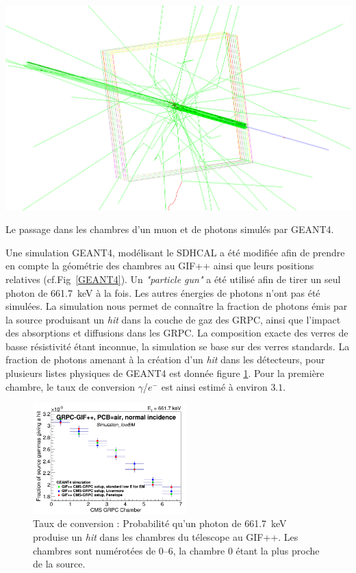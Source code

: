 \marginpar
{
	\centering
	\includegraphics[width=\marginparwidth]{GLA/geant4.png}
	\captionsetup{type=figure}\caption{Le passage dans les chambres d'un muon et de photons simulés par GEANT4.}
	\label{GEANT4}
}

Une simulation GEANT4, modélisant le SDHCAL a été modifiée afin de prendre en compte la géométrie des chambres au GIF++ ainsi que leurs positions relatives (cf.Fig~\ref{GEANT4}). Un \textit{"particle gun"} a été utilisé afin de tirer un seul photon de \SI{661.7}{\kilo\eV} à la fois. Les autres énergies de photons n'ont pas été simulées. La simulation nous permet de connaître la fraction de photons émis par la source produisant un \textit{hit} dans la couche de gaz des GRPC, ainsi que l'impact des absorptions et diffusions dans les GRPC. La composition exacte des verres de basse résistivité étant inconnue, la simulation se base sur des verres standards. La fraction de photons amenant à la création d'un \textit{hit} dans les détecteurs, pour plusieurs listes physiques de GEANT4 est donnée figure \ref{conversion}. Pour la première chambre, le taux de conversion $\gamma$/$e^{-}$ est ainsi estimé à environ $\num{3.1}$\textperthousand.

\begin{figure}[!ht]
	\centering
	\includegraphics[width=0.53\textwidth]{GLA/taux.png}
	\caption{Taux de conversion : Probabilité qu'un photon de \SI{661.7}{\kilo\eV} produise un \textit{hit} dans les chambres du télescope au GIF++. Les chambres sont numérotées de \SIrange{0}{6}{}, la chambre \num{0} étant la plus proche de la source.}
	\label{conversion}
\end{figure}

